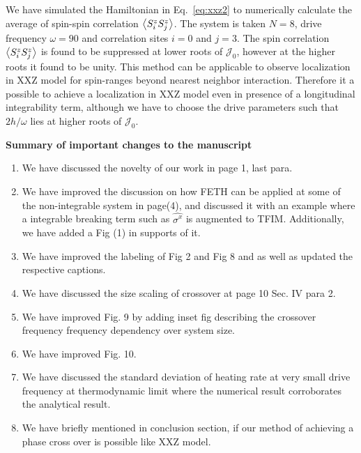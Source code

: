 \documentclass[aps,prb,reprint,showpacs,floatfix,superscriptaddress, onecolumn, nofootinbib, 9pt]{revtex4-2}
\begin{document}
\begin{enumerate}
{We have simulated the Hamiltonian in Eq.~\eqref{eq:xxz2} to numerically calculate the average of spin-spin correlation $\expval{S^z_i S^z_j}$. The system is taken $N=8$, drive frequency $\omega=90$ and correlation sites $i=0$ and $j=3$. The spin correlation $\expval{S^z_i S^z_j}$ is found to be suppressed at lower roots of $\mathcal{J}_0$, however at the higher roots it found to be unity. This method can be applicable to observe localization in XXZ model for spin-ranges beyond nearest neighbor interaction. Therefore it a possible to achieve a localization in XXZ model even in presence of a longitudinal integrability term, although we have to choose the drive parameters such that $2h/\omega$ lies at higher roots of $\mathcal{J}_0$. 


}
\end{enumerate}

\vskip 1cm 
\noindent \textbf{Summary of important changes to the  manuscript}

\begin{enumerate}
	\item We have discussed the novelty of our work in page 1, last para.
	\item We have improved the discussion on how FETH can be applied at some of the non-integrable system in page(4), and discussed it with an example where a integrable breaking term such as $\hat{\sigma^x}$ is augmented to TFIM. Additionally, we have added a Fig (1) in supports of it.
	\item We have improved the labeling of Fig 2 and Fig 8 and as well as updated the respective captions.
	\item We have discussed the size scaling of crossover at page 10 Sec. IV para 2.
	\item We have improved Fig. 9 by adding inset fig describing the crossover frequency frequency dependency over system size.
	\item We have improved Fig. 10.
	\item We have discussed the standard deviation of heating rate at very small drive frequency at thermodynamic limit where the numerical result corroborates the analytical result.
	\item We have briefly mentioned in conclusion section, if our method of achieving a phase cross over is possible like XXZ model. 
\end{enumerate}


	
	
\end{document}
